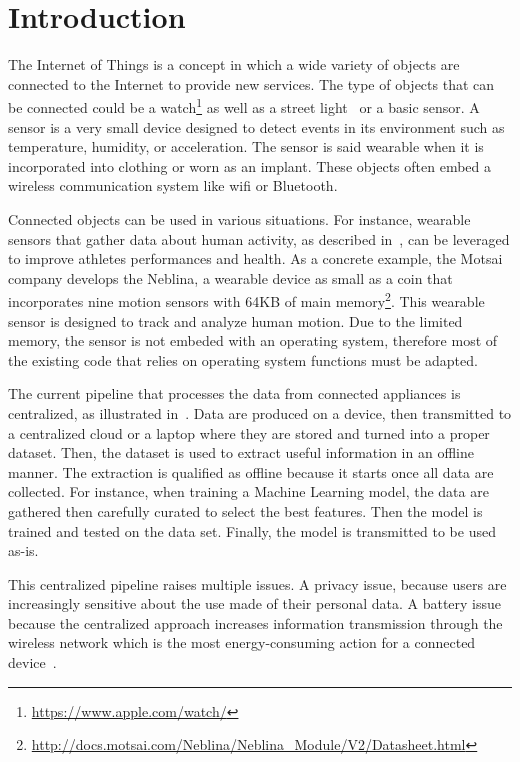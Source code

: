 \section{Introduction}
\label{sec:introduction}
The Internet of
Things is a concept in which a wide variety
of objects are connected to the Internet to
provide new services.  The
type of objects that can be connected could be a
watch\footnote{\url{https://www.apple.com/watch/}}
as well as a street light~\cite{smart-lamp-2011}
or a basic sensor. A sensor is a very small device
designed to detect events in its environment such
as temperature, humidity, or acceleration.  The
sensor is said wearable when it is incorporated
into clothing or worn as an implant. These objects often
embed a wireless communication system like wifi
or Bluetooth.  

Connected objects can be used in various
situations.  For instance, wearable sensors that
gather data about human activity, as described
in~\cite{recofit}, can be leveraged to improve
athletes performances and health.  As a concrete
example, the Motsai company develops the Neblina,
a wearable device as small as a coin that
incorporates nine motion sensors with 64KB of main
memory\footnote{\url{http://docs.motsai.com/Neblina/Neblina_Module/V2/Datasheet.html}}.
This wearable sensor is designed to track and
analyze human motion. Due to the limited memory,
the sensor is not embeded with an operating system,
therefore most of the existing code that relies on
operating system functions must be adapted.

The current pipeline that processes the data from
connected appliances is centralized, as
illustrated in~\cite{recofit}.  Data are produced
on a device, then transmitted to a centralized
cloud or a laptop where they are stored and turned
into a proper dataset. Then, the dataset is used
to extract useful information in an offline
manner.  The extraction is qualified as offline
because it starts once all data are collected. For
instance, when training a Machine Learning model,
the data are gathered then carefully curated to select
the best features. Then the model is trained and
tested on the data set. Finally, the model is
transmitted to be used as-is.

This centralized pipeline raises multiple issues.
A privacy issue, because users are increasingly
sensitive about the use made of their personal
data.  A battery issue because the centralized
approach increases information transmission through
the wireless network which is the most
energy-consuming action for a connected
device~\cite{sensor-network-survey,
sensor-energy-model}.

